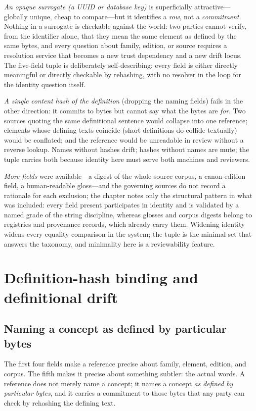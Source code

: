 \emph{An opaque surrogate (a UUID or database key)} is superficially
attractive---globally unique, cheap to compare---but it identifies a
\emph{row}, not a \emph{commitment}. Nothing in a surrogate is
checkable against the world: two parties cannot verify, from the
identifier alone, that they mean the same element as defined by the
same bytes, and every question about family, edition, or source
requires a resolution service that becomes a new trust dependency
and a new drift locus. The five-field tuple is deliberately
self-describing: every field is either directly meaningful or
directly checkable by rehashing, with no resolver in the loop for
the identity question itself.

\emph{A single content hash of the definition} (dropping the naming
fields) fails in the other direction: it commits to bytes but
cannot say what the bytes are \emph{for}. Two sources quoting the
same definitional sentence would collapse into one reference;
elements whose defining texts coincide (short definitions do
collide textually) would be conflated; and the reference would be
unreadable in review without a reverse lookup. Names without hashes
drift; hashes without names are mute; the tuple carries both
because identity here must serve both machines and reviewers.

\emph{More fields} were available---a digest of the whole source
corpus, a canon-edition field, a human-readable gloss---and the
governing sources do not record a rationale for each exclusion; the
chapter notes only the structural pattern in what was included:
every field present participates in identity and is validated by a
named grade of the string discipline, whereas glosses and corpus
digests belong to registries and provenance records, which already
carry them. Widening identity widens every equality comparison in
the system; the tuple is the minimal set that answers the taxonomy,
and minimality here is a reviewability feature.

\section{Definition-hash binding and definitional drift}\label{ch03:defhash}

\subsection{Naming a concept as defined by particular bytes}\label{ch03:asbytes}

The first four fields make a reference precise about family,
element, edition, and corpus. The fifth makes it precise about
something subtler: the actual words. A reference does not merely
name a concept; it names a concept \emph{as defined by particular
bytes}, and it carries a commitment to those bytes that any party
can check by rehashing the defining text.

